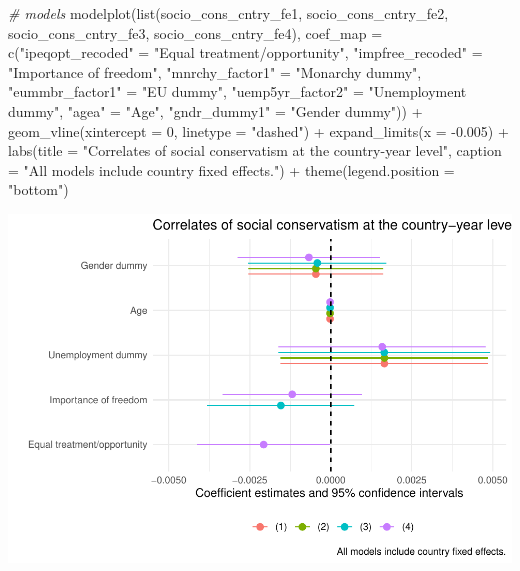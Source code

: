 \documentclass[
]{article}
\newenvironment{Shaded}{\begin{snugshade}}{\end{snugshade}}
\newcommand{\AttributeTok}[1]{\textcolor[rgb]{0.77,0.63,0.00}{#1}}
\newcommand{\CommentTok}[1]{\textcolor[rgb]{0.56,0.35,0.01}{\textit{#1}}}
\newcommand{\DecValTok}[1]{\textcolor[rgb]{0.00,0.00,0.81}{#1}}
\newcommand{\FloatTok}[1]{\textcolor[rgb]{0.00,0.00,0.81}{#1}}
\newcommand{\FunctionTok}[1]{\textcolor[rgb]{0.00,0.00,0.00}{#1}}
\newcommand{\NormalTok}[1]{#1}
\newcommand{\OtherTok}[1]{\textcolor[rgb]{0.56,0.35,0.01}{#1}}
\newcommand{\SpecialCharTok}[1]{\textcolor[rgb]{0.00,0.00,0.00}{#1}}
\newcommand{\StringTok}[1]{\textcolor[rgb]{0.31,0.60,0.02}{#1}}
\begin{document}
\begin{Shaded}
\begin{Highlighting}[]
\CommentTok{\# models }
\FunctionTok{modelplot}\NormalTok{(}\FunctionTok{list}\NormalTok{(socio\_cons\_cntry\_fe1, socio\_cons\_cntry\_fe2, }
\NormalTok{               socio\_cons\_cntry\_fe3, socio\_cons\_cntry\_fe4),}
          \AttributeTok{coef\_map =} \FunctionTok{c}\NormalTok{(}\StringTok{"ipeqopt\_recoded"} \OtherTok{=} \StringTok{"Equal treatment/opportunity"}\NormalTok{, }
                       \StringTok{"impfree\_recoded"} \OtherTok{=} \StringTok{"Importance of freedom"}\NormalTok{, }
                       \StringTok{"mnrchy\_factor1"} \OtherTok{=} \StringTok{"Monarchy dummy"}\NormalTok{, }
                       \StringTok{"eummbr\_factor1"} \OtherTok{=} \StringTok{"EU dummy"}\NormalTok{, }
                       \StringTok{"uemp5yr\_factor2"} \OtherTok{=} \StringTok{"Unemployment dummy"}\NormalTok{, }
                       \StringTok{"agea"} \OtherTok{=} \StringTok{"Age"}\NormalTok{, }
                       \StringTok{"gndr\_dummy1"} \OtherTok{=} \StringTok{"Gender dummy"}\NormalTok{)) }\SpecialCharTok{+}
  \FunctionTok{geom\_vline}\NormalTok{(}\AttributeTok{xintercept =} \DecValTok{0}\NormalTok{, }\AttributeTok{linetype =} \StringTok{"dashed"}\NormalTok{) }\SpecialCharTok{+}
  \FunctionTok{expand\_limits}\NormalTok{(}\AttributeTok{x =} \SpecialCharTok{{-}}\FloatTok{0.005}\NormalTok{) }\SpecialCharTok{+}
  \FunctionTok{labs}\NormalTok{(}\AttributeTok{title =} \StringTok{"Correlates of social conservatism at the country{-}year level"}\NormalTok{, }
       \AttributeTok{caption =} \StringTok{"All models include country fixed effects."}\NormalTok{) }\SpecialCharTok{+}
  \FunctionTok{theme}\NormalTok{(}\AttributeTok{legend.position =} \StringTok{"bottom"}\NormalTok{)}
\end{Highlighting}
\end{Shaded}

\includegraphics{AVCD-Assignment3-Edenhofer_files/figure-latex/socio-cons-cntry-fe-1.pdf}
\end{document}
